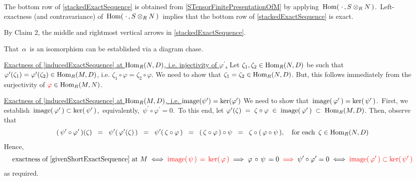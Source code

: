 \begin{enumerate}
	\vskip 0.2cm
	The bottom row of  \eqref{stackedExactSequence} is obtained from \eqref{STensorFinitePresentationOfM}
	by applying \,$\textnormal{Hom}(\;\cdot\,,S\otimes_{R}N\,)$.\, 
	Left-exactness (and contravariance) of \,$\textnormal{Hom}(\;\cdot\,,S\otimes_{R}N\,)$\,
	implies that the bottom row of \eqref{stackedExactSequence} is exact.

	\vskip 0.2cm
	By Claim 2, the middle and rightmost vertical arrows in \eqref{stackedExactSequence}.

	\vskip 0.2cm
	That \,$\alpha$\, is an isomorphism can be established via a diagram chase.
\end{enumerate}

\vskip 0.25cm
\noindent
\underline{Exactness of \eqref{inducedExactSequence} at $\textnormal{Hom}_{R}(N,D)$, i.e. {\color{red}injectivity of $\varphi^{\prime}$}{\color{white}.}}
\vskip 0.25cm
\noindent
Let $\zeta_{1}, \zeta_{2} \in \textnormal{Hom}_{R}(N,D)$ be such that
$\varphi^{\prime}(\zeta_{1}) = \varphi^{\prime}(\zeta_{2}) \in \textnormal{Hom}_{R}(M,D)$, i.e.
$\zeta_{1} \circ \varphi = \zeta_{2} \circ \varphi$.
We need to show that $\zeta_{1} = \zeta_{2} \in \textnormal{Hom}_{R}(N,D)$.
But, this follows immediately from the {\color{red}surjectivity of} ${\color{red}\varphi} \in \textnormal{Hom}_{R}(M,N)$.


\vskip 0.50cm
\noindent
\underline{Exactness of \eqref{inducedExactSequence} at $\textnormal{Hom}_{R}(M,D)$,\, i.e. $\textnormal{image}(\psi^{\prime}) = \ker(\varphi^{\prime})$}
\vskip 0.25cm
\noindent
We need to show that \,$\textnormal{image}(\,\varphi^{\prime}\,) = \ker(\,\psi^{\prime}\,)$.\,
First, we establish \,$\textnormal{image}(\,\varphi^{\prime}\,) \subset \ker(\,\psi^{\prime}\,)$,\,
equivalently, \,$\psi^{\prime} \circ \varphi^{\prime} = 0$.\,
To this end, let
$\varphi^{\prime}(\zeta) \;=\; \zeta \circ \varphi \;\in\; \textnormal{image}(\,\varphi^{\prime}\,) \;\subset\; \textnormal{Hom}_{R}(M,D)$.
Then, observe that
\begin{equation*}
(\,\psi^{\prime}\circ\varphi^{\prime}\,)(\zeta)
\;\; = \;\;
	\psi^{\prime}(\,\varphi^{\prime}(\zeta)\,)
\;\; = \;\;
	\psi^{\prime}(\,\zeta \circ \varphi\,)
\;\; = \;\;
	(\,\zeta \circ \varphi\,) \circ \psi
\;\; = \;\;
	\zeta \circ (\,\varphi \circ \psi\,),
\quad
	\textnormal{for each \,$\zeta \in \textnormal{Hom}_{R}(N,D)$}
\end{equation*}
Hence,
\begin{equation*}
\textnormal{exactness of \eqref{givenShortExactSequence} at $M$}
\; \Longleftrightarrow \;
	{\color{red}\textnormal{image}(\,\psi\,) \,=\, \ker(\,\varphi\,)}
\; \Longrightarrow \;
	\varphi \,\circ\, \psi \,= 0
\;\; {\color{red}\Longrightarrow} \;\;
	\psi^{\prime} \circ \varphi^{\prime} = 0
\; \Longleftrightarrow \;
	{\color{red}\textnormal{image}(\,\varphi^{\prime}\,) \subset \ker(\,\psi^{\prime}\,)}
\end{equation*}
as required.

